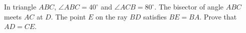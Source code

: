 In triangle $ABC$, $\angle ABC=40^\circ$ and $\angle ACB=80^\circ$. The bisector of angle $ABC$ meets $AC$ at $D$. The point $E$ on the ray $BD$ satisfies $BE=BA$. Prove that $AD=CE$.
